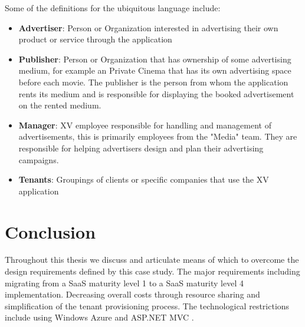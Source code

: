 Some of the definitions for the ubiquitous language include: 
\begin{itemize}
\item \textbf{Advertiser}: Person or Organization interested in advertising their own product or service through the application
\item \textbf{Publisher}: Person or Organization that has ownership of some advertising medium, for example an Private Cinema that has its own advertising space before each movie. The publisher is the person from whom the application rents its medium and is responsible for displaying the booked advertisement on the rented medium. 
\item \textbf{Manager}: XV employee responsible for handling and management of advertisements, this is primarily employees from the "Media" team. They are responsible for helping advertisers design and plan their advertising campaigns.
\item \textbf{Tenants}: Groupings of clients or specific companies that use the XV application
\end{itemize}	


\section{Conclusion}

Throughout this thesis we discuss and articulate means of which to overcome the design requirements defined by this case study. The major requirements including migrating from a SaaS maturity level 1 to a SaaS maturity level 4 implementation. Decreasing overall costs through resource sharing and simplification of the tenant provisioning process. The technological restrictions include using Windows Azure and ASP.NET MVC .